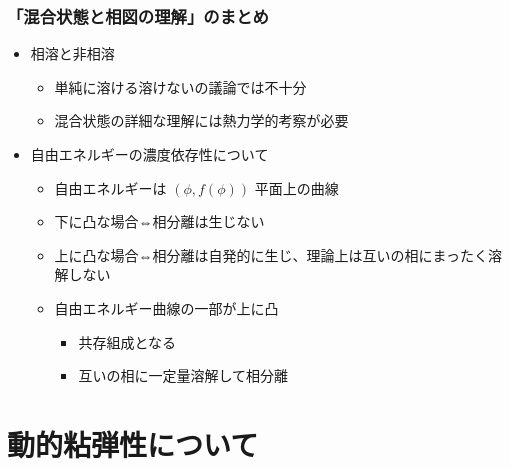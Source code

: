 \documentclass[12pt, dvipdfmx]{beamer}
\begin{document}
\begin{frame}
	\frametitle{「混合状態と相図の理解」のまとめ}
        \begin{boxnote}
            \vspace{-3mm}
            \begin{itemize}
                \item 相溶と非相溶
                    \begin{itemize}
						\item 単純に溶ける溶けないの議論では不十分
                        \item 混合状態の詳細な理解には熱力学的考察が必要
                    \end{itemize}
				\item 自由エネルギーの濃度依存性について
                    \begin{itemize}
                        \item 自由エネルギーは $(\phi, f(\phi))$ 平面上の曲線
						\item 下に凸な場合⇔相分離は生じない
						\item 上に凸な場合⇔相分離は自発的に生じ、理論上は互いの相にまったく溶解しない
                        \item 自由エネルギー曲線の一部が上に凸
                        \begin{itemize}
							\item 共存組成となる
							\item 互いの相に一定量溶解して相分離
						\end{itemize}
                    \end{itemize} 
            \end{itemize}
        \end{boxnote}
\end{frame}

\section{動的粘弾性について}
\end{document}
